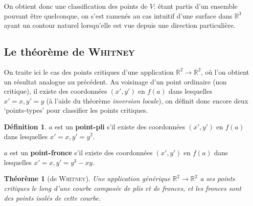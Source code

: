 \documentclass{article}
\newcommand{\R}{\mathbb{R}}
\newtheorem{thm}{Théorème}
\theoremstyle{definition}
\newtheorem{defn}{Définition}
\begin{document}
On obtient donc une classification des points de $V$: étant partis d'un ensemble pouvant être quelconque, on s'est ramenés au cas intuitif d'une surface dans $\R^3$ ayant un contour naturel lorsqu'elle est vue depuis une direction particulière.

\subsection{Le théorème de \textsc{Whitney}}

On traite ici le cas des points critiques d'une application $\R^2\to\R^2$, où l'on obtient un résultat analogue au précédent.
Au voisinage d'un point ordinaire (non critique), il existe des coordonnées $(x',y')$ en $f(a)$ dans lesquelles $x' = x, y' = y$ (à l'aide du théorème \textit{inversion locale}), on définit donc encore deux `points-types' pour classifier les points critiques.
\begin{defn}
	$a$ est un \textbf{point-pli} s'il existe des coordonnées $(x',y')$ en $f(a)$ dans lesquelles $x' = x, y' = y^2$.

	$a$ est un \textbf{point-fronce} s'il existe des coordonnées $(x',y')$ en $f(a)$ dans lesquelles $x' = x, y' = y^3 - xy$.
\end{defn}
\begin{thm}[de \textsc{Whitney}]
	Une application générique $\R^2\to\R^2$ a ses points critiques le long d'une courbe composée de plis et de fronces, et les fronces sont des points isolés de cette courbe.
\end{thm}
\end{document}
